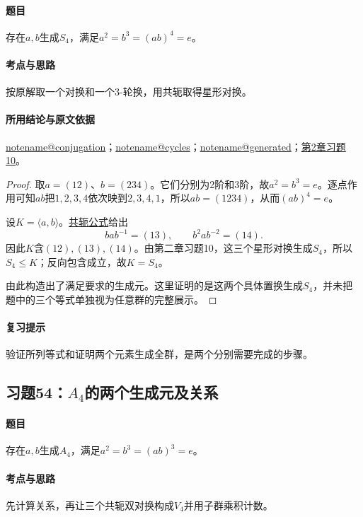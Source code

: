 \documentclass[UTF8,a4paper,11pt,fontset=windows]{ctexart}
\makeatletter
\newcommand{\noteref}[1]{\hyperref[note:#1]{\csname notename@#1\endcsname}}
\newcommand{\proofref}[2]{\hyperref[note:#1]{#2}}
\newcommand{\exref}[2]{\hyperref[ex:#1:#2]{第#1章习题#2}}
\makeatother
\begin{document}
\paragraph{题目}
存在$a,b$生成$S_4$，满足$a^2=b^3=(ab)^4=e$。

\paragraph{考点与思路}
按原解取一个对换和一个3-轮换，用共轭取得星形对换。

\paragraph{所用结论与原文依据}
\noteref{conjugation}；\noteref{cycles}；\noteref{generated}；\exref{2}{10}。


\begin{proof}
取$a=(12)$、$b=(234)$。它们分别为2阶和3阶，故$a^2=b^3=e$。逐点作用可知$ab$把$1,2,3,4$依次映到$2,3,4,1$，所以$ab=(1234)$，从而$(ab)^4=e$。

设$K=\langle a,b\rangle$。\proofref{conjugation}{共轭公式}给出
\[
bab^{-1}=(13),\qquad b^2ab^{-2}=(14).
\]
因此$K$含$(12),(13),(14)$。由第二章习题10，这三个星形对换生成$S_4$，所以$S_4\leq K$；反向包含成立，故$K=S_4$。

由此构造出了满足要求的生成元。这里证明的是这两个具体置换生成$S_4$，并未把题中的三个等式单独视为任意群的完整展示。
\end{proof}

\paragraph{复习提示}
验证所列等式和证明两个元素生成全群，是两个分别需要完成的步骤。


\subsection{习题54：\texorpdfstring{$A_4$的两个生成元及关系}{A4的两个生成元及关系}}
\label{ex:2:54}

\paragraph{题目}
存在$a,b$生成$A_4$，满足$a^2=b^3=(ab)^3=e$。

\paragraph{考点与思路}
先计算关系，再让三个共轭双对换构成$V_4$并用子群乘积计数。
\end{document}
